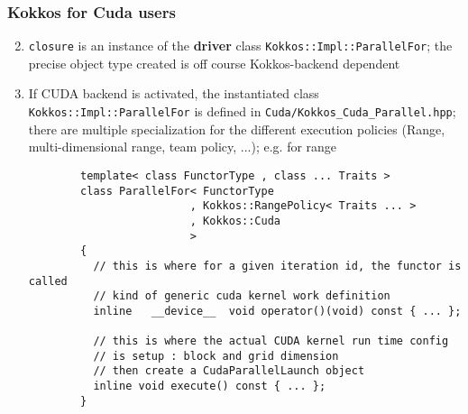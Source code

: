 \begin{frame}[fragile=singleslide]
  \frametitle{Kokkos for Cuda users}


  \begin{enumerate}
    \setcounter{enumi}{1}
  \item \texttt{closure} is an instance of the {\bf driver} class \texttt{Kokkos::Impl::ParallelFor}; the precise object type created is off course Kokkos-backend dependent
  \item If CUDA backend is activated, the instantiated class \texttt{Kokkos::Impl::ParallelFor} is defined in \texttt{Cuda/Kokkos\_Cuda\_Parallel.hpp}; there are multiple specialization for the different execution policies (Range, multi-dimensional range, team policy, ...); e.g. for range
    {\scriptsize
      \begin{verbatim}
        template< class FunctorType , class ... Traits >
        class ParallelFor< FunctorType
                         , Kokkos::RangePolicy< Traits ... >
                         , Kokkos::Cuda
                         >
        {
          // this is where for a given iteration id, the functor is called
          // kind of generic cuda kernel work definition
          inline   __device__  void operator()(void) const { ... };

          // this is where the actual CUDA kernel run time config
          // is setup : block and grid dimension
          // then create a CudaParallelLaunch object
          inline void execute() const { ... };
        }

      \end{verbatim}
  }
  \end{enumerate}

\end{frame}

